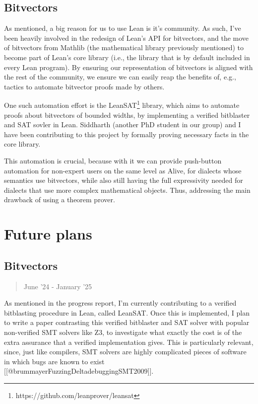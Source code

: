 \hypertarget{bitvectors}{%
\subsection{Bitvectors}\label{bitvectors}}

As mentioned, a big reason for us to use Lean is it's community. As
such, I've been heavily involved in the redesign of Lean's API for
bitvectors, and the move of bitvectors from Mathlib (the mathematical
library previously mentioned) to become part of Lean's core library
(i.e., the library that is by default included in every Lean program).
By ensuring our representation of bitvectors is aligned with the rest of
the community, we ensure we can easily reap the benefits of, e.g.,
tactics to automate bitvector proofs made by others.

One such automation effort is the LeanSAT\footnote{https://github.com/leanprover/leansat}
library, which aims to automate proofs about bitvectors of bounded
widths, by implementing a verified bitblaster and SAT sovler in Lean.
Siddharth (another PhD student in our group) and I have been
contributing to this project by formally proving necessary facts in the
core library.

This automation is crucial, because with it we can provide push-button
automation for non-expert users on the same level as Alive, for dialects
whose semantics use bitvectors, while also still having the full
expressivity needed for dialects that use more complex mathematical
objects. Thus, addressing the main drawback of using a theorem prover.

\hypertarget{future-plans}{%
\section{Future plans}\label{future-plans}}

\hypertarget{bitvectors-1}{%
\subsection{Bitvectors}\label{bitvectors-1}}

\begin{quote}
June '24 - January '25
\end{quote}

As mentioned in the progress report, I'm currently contributing to a
verified bitblasting procedure in Lean, called LeanSAT. Once this is
implemented, I plan to write a paper contrasting this verified
bitblaster and SAT solver with popular non-verified SMT solvers like Z3,
to investigate what exactly the cost is of the extra assurance that a
verified implementation gives. This is particularly relevant, since,
just like compilers, SMT solvers are highly complicated pieces of
software in which bugs are known to exist
{[}{[}@brummayerFuzzingDeltadebuggingSMT2009{]}{]}.

